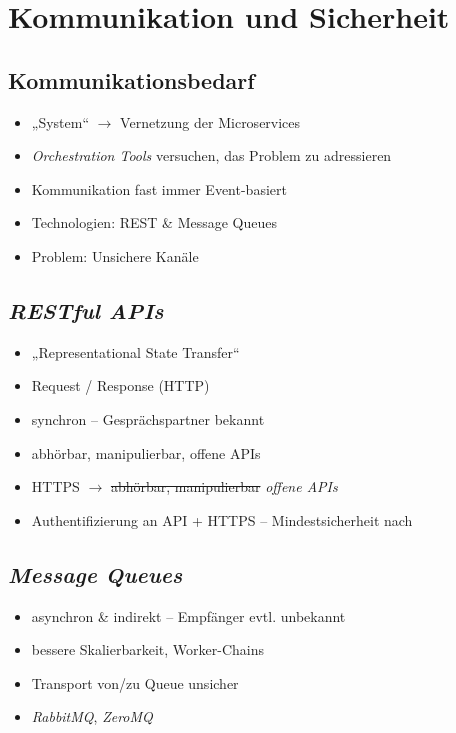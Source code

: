 \documentclass{beamer}
\begin{document}
\section{Kommunikation und Sicherheit}

\subsection{Kommunikationsbedarf}
\begin{frame}{\insertsubsection}
	\begin{itemize}
		\setlength\itemsep{1em}
		\item „System“ $\rightarrow$ Vernetzung der Microservices
		\item \textit{Orchestration Tools} versuchen, das Problem zu adressieren
		\item Kommunikation fast immer Event-basiert
		\item Technologien: REST \& Message Queues
		\item Problem: Unsichere Kanäle
	\end{itemize}
\end{frame}

\subsection{\em RESTful APIs}
\begin{frame}{\insertsubsection}
	\begin{itemize}
		\setlength\itemsep{1em}
		\item „Representational State Transfer“
		\item Request / Response (HTTP)
		\item synchron -- Gesprächspartner bekannt
		\item abhörbar, manipulierbar, offene APIs
		\item HTTPS $\rightarrow$ \sout{abhörbar, manipulierbar} \emph{offene APIs}
		\item Authentifizierung an API + HTTPS -- Mindestsicherheit nach \cite{newman2015}
	\end{itemize}
\end{frame}

\subsection{\em Message Queues}
\begin{frame}{\insertsubsection}
	\begin{itemize}
		\setlength\itemsep{2em}
		\item asynchron \& indirekt -- Empfänger evtl. unbekannt
		\item bessere Skalierbarkeit, Worker-Chains
		\item Transport von/zu Queue unsicher
		\item \textit{RabbitMQ}, \textit{ZeroMQ}
	\end{itemize}
\end{frame}
\end{document}
